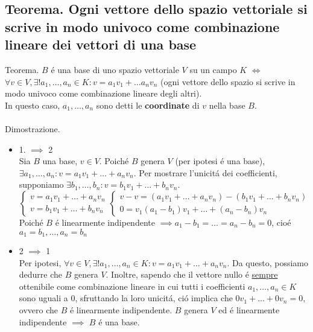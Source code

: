 \documentclass{article}
\begin{document}
\subsection{Teorema. Ogni vettore dello spazio vettoriale si scrive in modo univoco come combinazione lineare dei vettori di una base}
Teorema. $B$ é una base di uno spazio vettoriale $V$ su un campo $K$ $\iff$ $\forall v \in V, \exists! a_1, \dots, a_n \in K : v = a_1v_1 + \dots a_nv_n$ (ogni vettore dello spazio si scrive in modo univoco come combinazione lineare degli altri).\\
In questo caso, $a_1, \dots, a_n$ sono detti le \textbf{coordinate} di $v$ nella base $B$.\\\\
Dimostrazione.
\begin{itemize}
	\item 1. $\implies$ 2\\
Sia $B$ una base, $v \in V$. Poiché $B$ genera $V$ (per ipotesi é una base), $\exists a_1, \dots, a_n : v = a_1v_1 + \dots + a_nv_n$. Per mostrare l'unicitá dei coefficienti, supponiamo $\exists b_1, \dots, b_n : v= b_1v_1 + \dots + b_nv_n$.\\
\begin{equation}
	\begin{cases}
		v = a_1v_1 + \dots + a_nv_n \\
		v = b_1v_1 + \dots + b_nv_n
	\end{cases}
	\begin{cases}
		v - v = (a_1v_1 + \dots + a_nv_n) - (b_1v_1 + \dots + b_nv_n) \\
		0 = v_1 (a_1 - b_1)v_1 + \dots + (a_n - b_n)v_n
	\end{cases}
\end{equation}
Poiché $B$ é linearmente indipendente $\implies a_1-b_1 = \dots = a_n - b_n = 0$, cioé $a_1 = b_1, \dots, a_n = b_n$
	\item 2 $\implies$ 1\\
Per ipotesi, $\forall v \in V, \exists! a_1, \dots, a_n \in K : v = a_1v_1 + \dots + a_nv_n$. Da questo, possiamo dedurre che $B$ genera $V$. Inoltre, sapendo che il vettore nullo é \underline{sempre} ottenibile come combinazione lineare in cui tutti i coefficienti $a_1, \dots, a_n \in K$ sono uguali a 0, sfruttando la loro unicitá, ció implica che $0v_1 + \dots + 0v_n = 0$, ovvero che $B$ é linearmente indipendente. $B$ genera $V$ ed é linearmente indipendente $\implies$ $B$ é una base.
\end{itemize}
\end{document}
